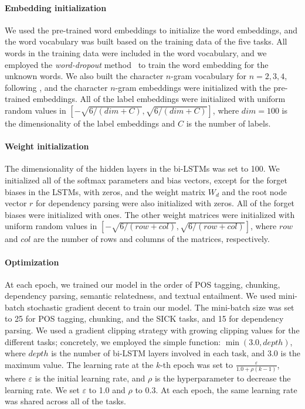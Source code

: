 \documentclass[11pt,a4paper]{article}
\begin{document}
\paragraph{Embedding initialization}
We used the pre-trained word embeddings to initialize the word embeddings, and the word vocabulary was built based on the training data of the five tasks.
All words in the training data were included in the word vocabulary, and we employed the {\it word-dropout} method~\citep{kiperwasser2016} to train the word embedding for the unknown words.
We also built the character $n$-gram vocabulary for $n=2, 3, 4$, following \citet{wieting2016}, and the character $n$-gram embeddings were initialized with the pre-trained embeddings.
All of the label embeddings were initialized with uniform random values in $[-\sqrt{6/(dim+C)}, \sqrt{6/(dim+C)}]$, where $dim=100$ is the dimensionality of the label embeddings and $C$ is the number of labels.

\paragraph{Weight initialization}
The dimensionality of the hidden layers in the bi-LSTMs was set to 100.
We initialized all of the softmax parameters and bias vectors, except for the forget biases in the LSTMs, with zeros, and the weight matrix $W_d$ and the root node vector $r$ for dependency parsing were also initialized with zeros.
All of the forget biases were initialized with ones.
The other weight matrices were initialized with uniform random values in $[-\sqrt{6/(row+col)}, \sqrt{6/(row+col)}]$, where $row$ and $col$ are the number of rows and columns of the matrices, respectively.

\paragraph{Optimization}
At each epoch, we trained our model in the order of POS tagging, chunking, dependency parsing, semantic relatedness, and textual entailment.
We used mini-batch stochastic gradient decent to train our model.
The mini-batch size was set to 25 for POS tagging, chunking, and the SICK tasks, and 15 for dependency parsing.
We used a gradient clipping strategy with growing clipping values for the different tasks; concretely, we employed the simple function: $\min(3.0, depth)$, where $depth$ is the number of bi-LSTM layers involved in each task, and $3.0$ is the maximum value.
The learning rate at the $k$-th epoch was set to $\frac{\varepsilon}{1.0+\rho (k-1)}$, where $\varepsilon$ is the initial learning rate, and $\rho$ is the hyperparameter to decrease the learning rate.
We set $\varepsilon$ to 1.0 and $\rho$ to 0.3.
At each epoch, the same learning rate was shared across all of the tasks.
\end{document}

